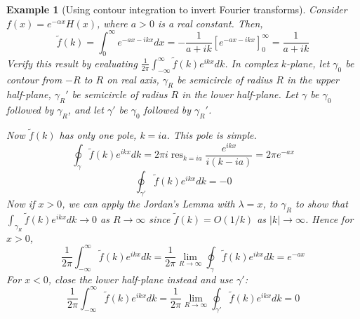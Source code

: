 \documentclass[a4paper]{article}
\DeclareMathOperator{\res}{res}
\newtheorem{eg}{Example}[section]
\theoremstyle{new}
\begin{document}
\begin{eg}[Using contour integration to invert Fourier transforms]
Consider $f(x)=e^{-\alpha x}H(x)$, where $a>0$ is a real constant. Then,
$$\tilde{f}(k)=\int_0^\infty e^{-ax-ikx}dx=-\frac{1}{a+ik}[e^{-ax-ikx}]_0^\infty=\frac{1}{a+ik}$$
Verify this result by evaluating $\frac{1}{2\pi}\int_{-\infty}^\infty\tilde{f}(k)e^{ikx}dk$. In complex $k$-plane, let $\gamma_0$ be contour from $-R$ to $R$ on real axis, $\gamma_R$ be semicircle of radius $R$ in the upper half-plane, $\gamma_R'$ be semicircle of radius $R$ in the lower half-plane. Let $\gamma$ be $\gamma_0$ followed by $\gamma_R$, and let $\gamma'$ be $\gamma_0$ followed by $\gamma_R'$.
\begin{center}
  \end{center}
Now $\tilde{f}(k)$ has only one pole, $k=ia$. This pole is simple.
$$\oint_\gamma\tilde{f}(k)e^{ikx}dk=2\pi i\res_{k=ia}\frac{e^{ikx}}{i(k-ia)}=2\pi e^{-ax}$$
$$\oint_{\gamma'}\tilde{f}(k)e^{ikx}dk=-0$$
Now if $x>0$, we can apply the Jordan's Lemma with $\lambda =x$, to $\gamma_R$ to show that $\int_{\gamma_R}\tilde{f}(k)e^{ikx}dk\rightarrow 0$ as $R\rightarrow\infty$ since $\tilde{f}(k)=O(1/k)$ as $|k|\rightarrow\infty$. Hence for $x>0$,
$$\frac{1}{2\pi}\int_{-\infty}^\infty\tilde{f}(k)e^{ikx}dk=\frac{1}{2\pi}\lim_{R\rightarrow\infty}\oint_\gamma\tilde{f}(k)e^{ikx}dk=e^{-ax}$$
For $x<0$, close the lower half-plane instead and use $\gamma'$:
$$\frac{1}{2\pi}\int_{-\infty}^\infty\tilde{f}(k)e^{ikx}dk=\frac{1}{2\pi}\lim_{R\rightarrow\infty}\oint_{\gamma'}\tilde{f}(k)e^{ikx}dk=0$$
\end{eg}
\end{document}
